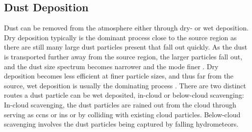 \subsection{Dust Deposition}
Dust can be removed from the atmosphere either through dry- or wet deposition. 
Dry deposition typically is the dominant process close to the source region as there are still many large dust particles present that fall out quickly. 
As the dust is transported further away from the source region, the larger particles fall out, and the dust size spectrum becomes narrower and the mode finer \parencite{does2016particle}.
Dry deposition becomes less efficient at finer particle sizes, and thus far from the source, wet deposition is usually the dominating process .
There are two distinct routes a dust particle can be wet deposited, in-cloud or below-cloud scavenging: 
In-cloud scavenging, the dust particles are rained out from the cloud through serving as \acrshort{ccn}s or \acrshort{in}s or by colliding with existing cloud particles. Below-cloud scavenging involves the dust particles being captured by falling hydrometeors. 


